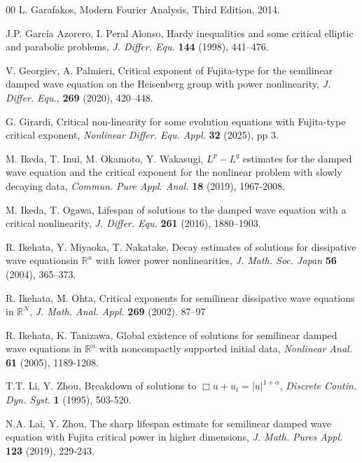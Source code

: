 \documentclass[11pt,reqno]{amsart}
\begin{document}
\begin{thebibliography}{00}
 L. Garafakos, Modern Fourier Analysis, Third Edition, 2014.

 J.P. García Azorero, I. Peral Alonso, Hardy inequalities and some critical elliptic and parabolic
problems, \textit{J. Differ. Equ. } \textbf{144} (1998), 441–476.

 V. Georgiev, A. Palmieri, Critical exponent of Fujita-type for the semilinear damped wave
equation on the Heisenberg group with power nonlinearity, \textit{J. Differ. Equ.}, \textbf{269} (2020),
420–448.

 G. Girardi, Critical non-linearity for some evolution equations with Fujita-type
critical exponent, \textit{Nonlinear Differ. Equ. Appl. } \textbf{32} (2025), pp 3.


 M. Ikeda, T. Inui, M. Okamoto, Y. Wakasugi, $L^p - L^q$ estimates for the damped wave equation and the critical exponent for the nonlinear problem with slowly decaying data, \textit{Commun. Pure Appl. Anal.} \textbf{18} (2019), 1967-2008.

  M. Ikeda, T. Ogawa, Lifespan of solutions to the damped wave equation with a critical nonlinearity, \textit{J. Differ. Equ.} \textbf{261} (2016),  1880–1903.

 R. Ikehata, Y. Miyaoka, T. Nakatake, Decay estimates of solutions for dissipative wave equationsin $\mathbb{R}^n$ with lower power nonlinearities, \textit{J. Math. Soc. Japan} \textbf{56} (2004), 365–373. 


 R. Ikehata, M. Ohta, Critical exponents for semilinear dissipative wave equations in $\mathbb{R}^N$, \textit{J. Math. Anal. Appl.} \textbf{269} (2002).  87–97

 R. Ikehata, K. Tanizawa, Global existence of solutions for semilinear damped
wave equations in $\mathbb{R}^n$ with noncompactly supported
initial data, \textit{Nonlinear Anal.} \textbf{61} (2005), 1189-1208.


 T.T. Li, Y. Zhou,  Breakdown of solutions to $\Box u + u_t = |u|^{1+\alpha}$, \textit{Discrete
Contin. Dyn. Syst. } \textbf{1}       (1995), 503-520. 



 N.A. Lai, Y. Zhou, The sharp lifespan estimate for semilinear damped wave equation with Fujita critical power in higher dimensions, \textit{J. Math. Pures Appl.} \textbf{123} (2019), 229-243.


\end{thebibliography}
\end{document}
